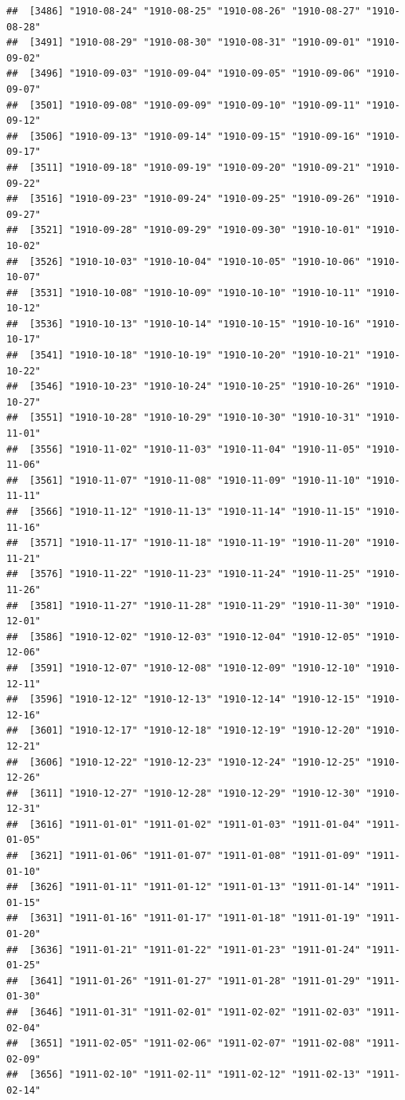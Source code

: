 \documentclass{article}\usepackage[]{graphicx}\usepackage[]{color}
\makeatletter
\newenvironment{kframe}{%
 \def\at@end@of@kframe{}%
 \ifinner\ifhmode%
  \def\at@end@of@kframe{\end{minipage}}%
  \begin{minipage}{\columnwidth}%
 \fi\fi%
 \def\FrameCommand##1{\hskip\@totalleftmargin \hskip-\fboxsep
 \colorbox{shadecolor}{##1}\hskip-\fboxsep
     \hskip-\linewidth \hskip-\@totalleftmargin \hskip\columnwidth}%
 \MakeFramed {\advance\hsize-\width
   \@totalleftmargin\z@ \linewidth\hsize
   \@setminipage}}%
 {\par\unskip\endMakeFramed%
 \at@end@of@kframe}
\newenvironment{knitrout}{}{} %
\makeatother
\begin{document}
\begin{description}
\begin{knitrout}
\begin{kframe}
\begin{verbatim}
##  [3486] "1910-08-24" "1910-08-25" "1910-08-26" "1910-08-27" "1910-08-28"
##  [3491] "1910-08-29" "1910-08-30" "1910-08-31" "1910-09-01" "1910-09-02"
##  [3496] "1910-09-03" "1910-09-04" "1910-09-05" "1910-09-06" "1910-09-07"
##  [3501] "1910-09-08" "1910-09-09" "1910-09-10" "1910-09-11" "1910-09-12"
##  [3506] "1910-09-13" "1910-09-14" "1910-09-15" "1910-09-16" "1910-09-17"
##  [3511] "1910-09-18" "1910-09-19" "1910-09-20" "1910-09-21" "1910-09-22"
##  [3516] "1910-09-23" "1910-09-24" "1910-09-25" "1910-09-26" "1910-09-27"
##  [3521] "1910-09-28" "1910-09-29" "1910-09-30" "1910-10-01" "1910-10-02"
##  [3526] "1910-10-03" "1910-10-04" "1910-10-05" "1910-10-06" "1910-10-07"
##  [3531] "1910-10-08" "1910-10-09" "1910-10-10" "1910-10-11" "1910-10-12"
##  [3536] "1910-10-13" "1910-10-14" "1910-10-15" "1910-10-16" "1910-10-17"
##  [3541] "1910-10-18" "1910-10-19" "1910-10-20" "1910-10-21" "1910-10-22"
##  [3546] "1910-10-23" "1910-10-24" "1910-10-25" "1910-10-26" "1910-10-27"
##  [3551] "1910-10-28" "1910-10-29" "1910-10-30" "1910-10-31" "1910-11-01"
##  [3556] "1910-11-02" "1910-11-03" "1910-11-04" "1910-11-05" "1910-11-06"
##  [3561] "1910-11-07" "1910-11-08" "1910-11-09" "1910-11-10" "1910-11-11"
##  [3566] "1910-11-12" "1910-11-13" "1910-11-14" "1910-11-15" "1910-11-16"
##  [3571] "1910-11-17" "1910-11-18" "1910-11-19" "1910-11-20" "1910-11-21"
##  [3576] "1910-11-22" "1910-11-23" "1910-11-24" "1910-11-25" "1910-11-26"
##  [3581] "1910-11-27" "1910-11-28" "1910-11-29" "1910-11-30" "1910-12-01"
##  [3586] "1910-12-02" "1910-12-03" "1910-12-04" "1910-12-05" "1910-12-06"
##  [3591] "1910-12-07" "1910-12-08" "1910-12-09" "1910-12-10" "1910-12-11"
##  [3596] "1910-12-12" "1910-12-13" "1910-12-14" "1910-12-15" "1910-12-16"
##  [3601] "1910-12-17" "1910-12-18" "1910-12-19" "1910-12-20" "1910-12-21"
##  [3606] "1910-12-22" "1910-12-23" "1910-12-24" "1910-12-25" "1910-12-26"
##  [3611] "1910-12-27" "1910-12-28" "1910-12-29" "1910-12-30" "1910-12-31"
##  [3616] "1911-01-01" "1911-01-02" "1911-01-03" "1911-01-04" "1911-01-05"
##  [3621] "1911-01-06" "1911-01-07" "1911-01-08" "1911-01-09" "1911-01-10"
##  [3626] "1911-01-11" "1911-01-12" "1911-01-13" "1911-01-14" "1911-01-15"
##  [3631] "1911-01-16" "1911-01-17" "1911-01-18" "1911-01-19" "1911-01-20"
##  [3636] "1911-01-21" "1911-01-22" "1911-01-23" "1911-01-24" "1911-01-25"
##  [3641] "1911-01-26" "1911-01-27" "1911-01-28" "1911-01-29" "1911-01-30"
##  [3646] "1911-01-31" "1911-02-01" "1911-02-02" "1911-02-03" "1911-02-04"
##  [3651] "1911-02-05" "1911-02-06" "1911-02-07" "1911-02-08" "1911-02-09"
##  [3656] "1911-02-10" "1911-02-11" "1911-02-12" "1911-02-13" "1911-02-14"

\end{verbatim}
\end{kframe}
\end{knitrout}
\end{description}
\end{document}
